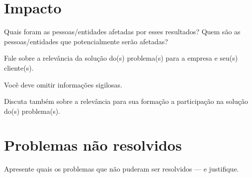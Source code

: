 %

\section{Impacto}

Quais foram as pessoas/entidades afetadas por esses resultados? Quem são  as pessoas/entidades que potencialmente serão afetadas?

Fale sobre a relevância da solução do(s) problema(s) para a empresa e seu(s) cliente(s).

Você deve omitir informações sigilosas.

Discuta também sobre a relevância para sua formação a  participação na solução do(s) problema(s).

\section{Problemas não resolvidos}

Apresente quais os problemas que não puderam ser resolvidos --- e justifique.
